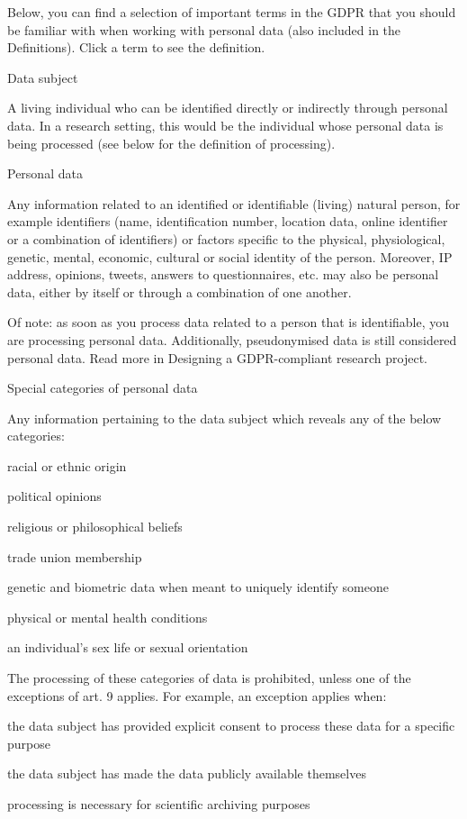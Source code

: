 \documentclass[
]{book}
\begin{document}
Below, you can find a selection of important terms in the GDPR that you should be familiar with when working with personal data (also included in the Definitions). Click a term to see the definition.

Data subject

A living individual who can be identified directly or indirectly through personal data. In a research setting, this would be the individual whose personal data is being processed (see below for the definition of processing).

Personal data

Any information related to an identified or identifiable (living) natural person, for example identifiers (name, identification number, location data, online identifier or a combination of identifiers) or factors specific to the physical, physiological, genetic, mental, economic, cultural or social identity of the person. Moreover, IP address, opinions, tweets, answers to questionnaires, etc. may also be personal data, either by itself or through a combination of one another.

Of note: as soon as you process data related to a person that is identifiable, you are processing personal data. Additionally, pseudonymised data is still considered personal data. Read more in Designing a GDPR-compliant research project.

Special categories of personal data

Any information pertaining to the data subject which reveals any of the below categories:

racial or ethnic origin

political opinions

religious or philosophical beliefs

trade union membership

genetic and biometric data when meant to uniquely identify someone

physical or mental health conditions

an individual's sex life or sexual orientation

The processing of these categories of data is prohibited, unless one of the exceptions of art. 9 applies. For example, an exception applies when:

the data subject has provided explicit consent to process these data for a specific purpose

the data subject has made the data publicly available themselves

processing is necessary for scientific archiving purposes
\end{document}
